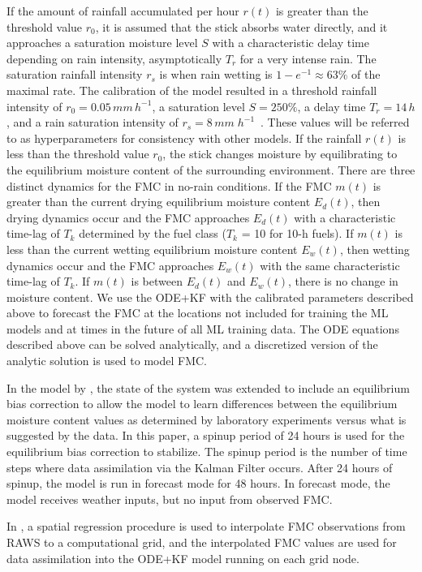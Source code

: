 \documentclass[fire,article,submit,pdftex,moreauthors]{Definitions/mdpi}
\begin{document}
If the amount of rainfall accumulated per hour $r(t)$ is greater than the threshold value $r_0$, it is assumed that the stick absorbs water directly, and it approaches a saturation moisture level $S$ with a characteristic delay time depending on rain intensity, asymptotically $T_r$ for a very intense rain. The saturation rainfall intensity $r_s$ is when rain wetting is $1-e^{-1}\approx 63\%$ of the maximal rate. The calibration of the model resulted in a threshold rainfall intensity of $r_0=0.05 \, mm\,h^{-1}$, a saturation level $S=250\%$, a delay time $T_r = 14\,h$, and a rain saturation intensity of $r_s=8 \,mm\;h^{-1}$~\citep{Mandel-2014-RAA}. These values will be referred to as hyperparameters for consistency with other models. If the rainfall $r(t)$ is less than the threshold value $r_0$, the stick changes moisture by equilibrating to the equilibrium moisture content of the surrounding environment. There are three distinct dynamics for the FMC in no-rain conditions. If the FMC $m(t)$ is greater than the current drying equilibrium moisture content $E_d(t)$, then drying dynamics occur and the FMC approaches $E_d(t)$ with a characteristic time-lag of $T_k$ determined by the fuel class ($T_k$ = 10 for 10-h fuels). If $m(t)$ is less than the current wetting equilibrium moisture content $E_w(t)$, then wetting dynamics occur and the FMC approaches $E_w(t)$ with the same characteristic time-lag of $T_k$. If $m(t)$ is between $E_d(t)$ and $E_w(t)$, there is no change in moisture content. We use the ODE+KF with the calibrated parameters described above to forecast the FMC at the locations not included for training the ML models and at times in the future of all ML training data. The ODE equations described above can be solved analytically, and a discretized version of the analytic solution is used to model FMC.

In the model by \citet{Vejmelka-2016-DAD}, the state of the system was extended to include an equilibrium bias correction to allow the model to learn differences between the equilibrium moisture content values as determined by laboratory experiments versus what is suggested by the data. In this paper, a spinup period of 24 hours is used for the equilibrium bias correction to stabilize. The spinup period is the number of time steps where data assimilation via the Kalman Filter occurs. After 24 hours of spinup, the model is run in forecast mode for 48 hours. In forecast mode, the model receives weather inputs, but no input from observed FMC. 

In \citet{Vejmelka-2016-DAD}, a spatial regression procedure is used to interpolate FMC observations from RAWS to a computational grid, and the interpolated FMC values are used for data assimilation into the ODE+KF model running on each grid node. 
\end{document}
